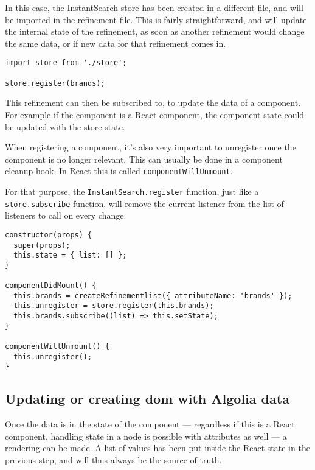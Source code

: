 In this case, the InstantSearch store has been created in a different file, and will be imported in the refinement file. This is fairly straightforward, and will update the internal state of the refinement, as soon as another refinement would change the same data, or if new data for that refinement comes in. 

\begin{minipage}{\linewidth}
\begin{lstlisting}[caption={Registering a refinement},label={lst:registering-refinement}]
import store from './store';

store.register(brands);
\end{lstlisting}
\end{minipage}

This refinement can then be subscribed to, to update the data of a component. For example if the component is a React component, the component state could be updated with the store state. 

When registering a component, it's also very important to unregister once the component is no longer relevant. This can usually be done in a component cleanup hook. In React this is called {\tt componentWillUnmount}.

For that purpose, the {\tt InstantSearch.register} function, just like a {\tt store.subscribe} function, will remove the current listener from the list of listeners to call on every change.

\begin{minipage}{\linewidth}
\begin{lstlisting}[caption={InstantSearch Core inside a React component},label={lst:core-react}]
constructor(props) {
  super(props);
  this.state = { list: [] };
}

componentDidMount() {
  this.brands = createRefinementlist({ attributeName: 'brands' });
  this.unregister = store.register(this.brands);
  this.brands.subscribe((list) => this.setState);
}

componentWillUnmount() {
  this.unregister();
}
\end{lstlisting}
\end{minipage}

\subsection{Updating or creating \acrshort{dom} with Algolia data}
\label{subs:data_to_dom}

Once the data is in the state of the component --- regardless if this is a React component, handling state in a node is possible with attributes as well --- a rendering can be made. A list of values has been put inside the React state in the previous step, and will thus always be the source of truth. 

